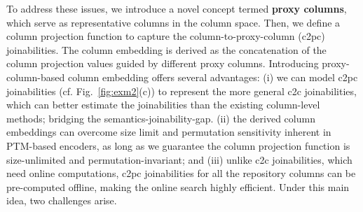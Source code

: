 To address these issues, 
we introduce a novel concept termed \textbf{proxy columns}, which serve as representative columns in the column space.
Then, we define a  column projection function to capture the column-to-proxy-column (c2pc) joinabilities. 
The column embedding is derived as the concatenation of the column projection values guided by different proxy columns.
Introducing proxy-column-based column embedding offers several advantages:  (i) we can model c2pc joinabilities (cf. Fig.~\ref{fig:exm2}(c)) to represent the more general c2c  joinabilities, which can better estimate the joinabilities than the existing column-level methods; bridging the semantics-joinability-gap.  (ii) the derived column embeddings can overcome size limit and permutation sensitivity inherent in PTM-based encoders, as long as we guarantee the column projection function is size-unlimited and permutation-invariant; and  (iii) unlike c2c  joinabilities, which need online computations, c2pc joinabilities for all the repository columns can be pre-computed offline, making the online search highly efficient.
Under this main idea, two challenges arise.

